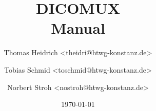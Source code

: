%
%

\begin{titlepage}
\title{ DICOMUX \\ Manual\\[2cm]
\centering
{}
}

\author {
Thomas Heidrich <theidri@htwg-konstanz.de> \and
Tobias Schmid <toschmid@htwg-konstanz.de> \and
Norbert Stroh <nostroh@htwg-konstanz.de>
}
\date{\today}
\maketitle
\end{titlepage}

%
%
